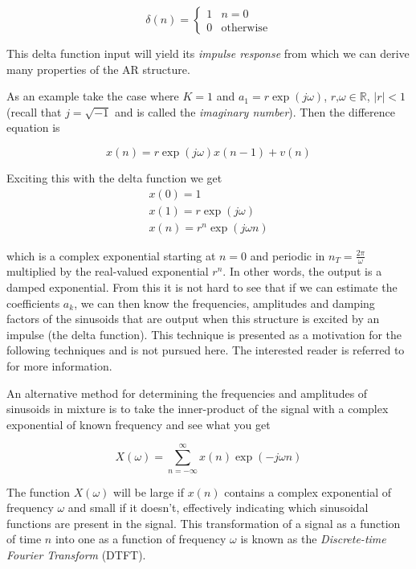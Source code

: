 \documentclass[letterpaper,12pt]{report}
\begin{document}
\begin{equation}
    \delta(n) = \begin{cases}
        1 & n=0\\
        0 & \text{otherwise}
    \end{cases}
\end{equation}

This delta function input will yield its \textit{impulse
response} from which we can derive many properties of the AR structure.

As an example take the case where $K=1$ and $a_1 = r \exp(j\omega)$, 
$r\text{,}\omega \in \mathbb{R}$, $|r|<1$ (recall that $j=\sqrt{-1}$ and is
called the \textit{imaginary number}). Then the difference equation is

\begin{equation}
    x(n) = r \exp(j\omega) x(n-1) + v(n)
\end{equation}

Exciting this with the delta function we get
\begin{equation}
    \begin{array}{c}
        x(0) = 1 \\
        x(1) = r \exp(j\omega) \\
        x(n) = r^n \exp(j\omega n)
    \end{array}
\end{equation}

which is a complex exponential starting at $n=0$ and periodic in
$n_T=\frac{2\pi}{\omega}$ multiplied by the real-valued
exponential $r^n$. In other words, the output is a damped exponential. From this
it is not hard to see that if we can estimate the coefficients $a_k$, we can
then know the frequencies, amplitudes and damping factors of the sinusoids that
are output when this structure is excited by an impulse (the delta function).
This technique is presented as a motivation for the following techniques and is
not pursued here. The interested reader is referred to \cite{makhoul1975linear}
for more information.

An alternative method for determining the frequencies and amplitudes of
sinusoids in mixture is to take the inner-product of the signal with a complex
exponential of known frequency and see what you get

\begin{equation}
    X(\omega) = \sum_{n=-\infty}^{\infty} x(n) \exp(-j \omega n)
\end{equation}

The function $X(\omega)$ will be large if $x(n)$ contains a complex exponential of
frequency $\omega$ and small if it doesn't, effectively indicating which
sinusoidal functions are present in the signal. This transformation of a signal
as a function of time $n$ into one as a function of frequency $\omega$ is known
as the \textit{Discrete-time Fourier Transform} (DTFT). 
\end{document}
